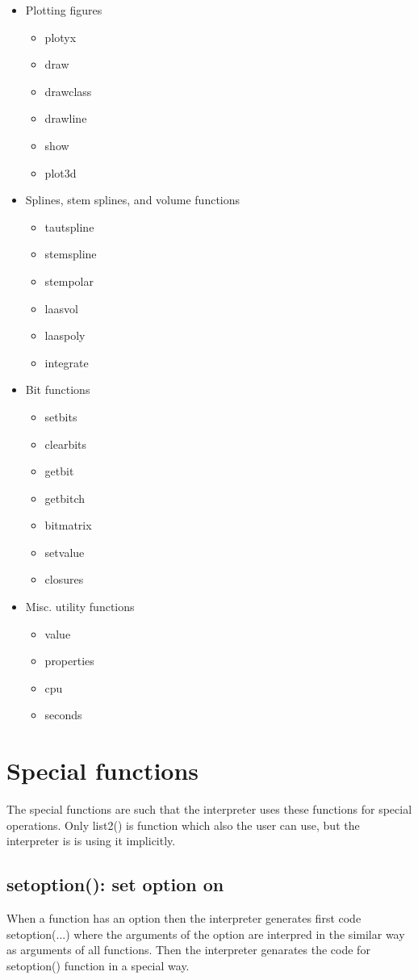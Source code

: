 \begin{itemize}
\item Plotting figures
\begin{itemize}
\item plotyx
\item draw
\item drawclass
\item drawline
\item show
\item plot3d
\end{itemize}
\item Splines, stem splines,  and volume functions
\begin{itemize}
\item tautspline
\item stemspline
\item stempolar
\item laasvol
\item laaspoly
\item integrate
\end{itemize}

\item Bit functions
\begin{itemize}
\item setbits
\item clearbits
\item getbit
\item getbitch
\item bitmatrix
\item setvalue
\item closures
\end{itemize}

\item  Misc. utility functions
\begin{itemize}
\item value
\item properties
\item cpu
\item seconds
\end{itemize}
\end{itemize}

\section{Special functions}
\label{special}
The special functions are such that the interpreter uses these functions for special operations.
Only \textcolor{VioletRed}{list2}() is function which also the user can use, but the interpreter is
is using it implicitly.
\subsection{\textcolor{VioletRed}{setoption}(): set option on}
\label{setoption}
When a function has an option then the interpreter generates first code
\textcolor{VioletRed}{setoption}(...) where the arguments of the option are interpred in the similar way as
arguments of all functions. Then the interpreter genarates the code for
\textcolor{VioletRed}{setoption}() function in a special way.
